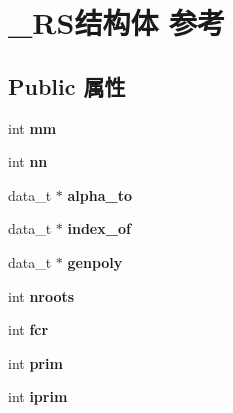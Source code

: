 \hypertarget{struct___r_s}{\section{\-\_\-\-R\-S结构体 参考}
\label{struct___r_s}
}
\subsection*{Public 属性}
\begin{DoxyCompactItemize}
\item 
\hypertarget{struct___r_s_a046c7e4ece716d243101048247f6cde4}{int {\bfseries mm}}\label{struct___r_s_a046c7e4ece716d243101048247f6cde4}

\item 
\hypertarget{struct___r_s_ab5663729b99e9ff8f7969e916fda2627}{int {\bfseries nn}}\label{struct___r_s_ab5663729b99e9ff8f7969e916fda2627}

\item 
\hypertarget{struct___r_s_a998f0e035861187dd6fbef37ca5789ac}{data\-\_\-t $\ast$ {\bfseries alpha\-\_\-to}}\label{struct___r_s_a998f0e035861187dd6fbef37ca5789ac}

\item 
\hypertarget{struct___r_s_af3406fa5684f5c96c2cd523522959c47}{data\-\_\-t $\ast$ {\bfseries index\-\_\-of}}\label{struct___r_s_af3406fa5684f5c96c2cd523522959c47}

\item 
\hypertarget{struct___r_s_aa6785d02605d937bcb035e62936cc245}{data\-\_\-t $\ast$ {\bfseries genpoly}}\label{struct___r_s_aa6785d02605d937bcb035e62936cc245}

\item 
\hypertarget{struct___r_s_a97be3a013ef02a581029d8219993ec2e}{int {\bfseries nroots}}\label{struct___r_s_a97be3a013ef02a581029d8219993ec2e}

\item 
\hypertarget{struct___r_s_ab9c03761dfc23661efaeba22fb60fc96}{int {\bfseries fcr}}\label{struct___r_s_ab9c03761dfc23661efaeba22fb60fc96}

\item 
\hypertarget{struct___r_s_a3e5a578b2322c98c7fc5bab914917b24}{int {\bfseries prim}}\label{struct___r_s_a3e5a578b2322c98c7fc5bab914917b24}

\item 
\hypertarget{struct___r_s_af0655eabb9315ddd69493cf9e476bcb8}{int {\bfseries iprim}}\label{struct___r_s_af0655eabb9315ddd69493cf9e476bcb8}


\end{DoxyCompactItemize}
